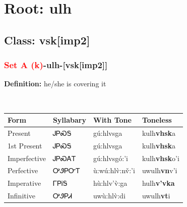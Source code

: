 \needspace{4in}
\section*{Root: ulh}
\nopagebreak
{}
\needspace{3in}
\subsection*{Class: vsk[imp2]}
\nopagebreak
\needspace{2in}
\subsubsection*{\textcolor{Red}{Set A (k)}{-}\textbf{ulh}{-}[vsk[imp2]]}
\nopagebreak
\textbf{Definition: } he/she is covering it
\\[0.5em]
\begin{tabularx}{\textwidth}{l X X X}%
\toprule%
\textbf{Form}&\textbf{Syllabary}&\textbf{With Tone}&\textbf{Toneless}\\%
\midrule%
Present&ᎫᏢᏍᎦ&gú:hlvsga&kulh\textbf{vhsk}a\\%
1st Present&ᎫᏢᏍᎦ&gú:hlvsga&kulh\textbf{vhsk}a\\%
Imperfective&ᎫᏢᏍᎪᎢ&gú:hlvsgó:’i&kulh\textbf{vhsk}o'i\\%
Perfective&ᎤᏭᏢᏅᎢ&ù:wú:hlv̀:nv̌:’i&uwulh\textbf{vn}v'i\\%
Imperative&ᎱᏢᎥᎦ&hù:hlv’v̀:ga&hulh\textbf{v'vka}\\%
Infinitive&ᎤᏭᏢᏗ&uwù:hlv̀:di&uwulh\textbf{vt}i\\%
\bottomrule%
\end{tabularx}
\\[1em]